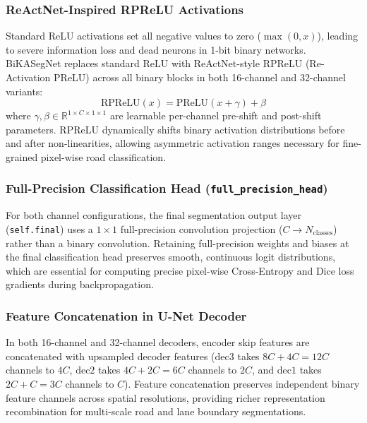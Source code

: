 \documentclass[a4paper]{report}
\begin{document}
\subsubsection{ReActNet-Inspired RPReLU Activations}
Standard ReLU activations set all negative values to zero ($\max(0, x)$), leading to severe information loss and dead neurons in 1-bit binary networks. BiKASegNet replaces standard ReLU with ReActNet-style RPReLU (Re-Activation PReLU) across all binary blocks in both 16-channel and 32-channel variants:
\begin{equation}
    \text{RPReLU}(x) = \text{PReLU}(x + \gamma) + \beta
\end{equation}
where $\gamma, \beta \in \mathbb{R}^{1 \times C \times 1 \times 1}$ are learnable per-channel pre-shift and post-shift parameters. RPReLU dynamically shifts binary activation distributions before and after non-linearities, allowing asymmetric activation ranges necessary for fine-grained pixel-wise road classification.

\subsubsection{Full-Precision Classification Head (\texttt{full\_precision\_head})}
For both channel configurations, the final segmentation output layer (\texttt{self.final}) uses a $1\times1$ full-precision convolution projection ($C \rightarrow N_{\text{classes}}$) rather than a binary convolution. Retaining full-precision weights and biases at the final classification head preserves smooth, continuous logit distributions, which are essential for computing precise pixel-wise Cross-Entropy and Dice loss gradients during backpropagation.

\subsubsection{Feature Concatenation in U-Net Decoder}
In both 16-channel and 32-channel decoders, encoder skip features are concatenated with upsampled decoder features ($\text{dec3}$ takes $8C + 4C = 12C$ channels to $4C$, $\text{dec2}$ takes $4C + 2C = 6C$ channels to $2C$, and $\text{dec1}$ takes $2C + C = 3C$ channels to $C$). Feature concatenation preserves independent binary feature channels across spatial resolutions, providing richer representation recombination for multi-scale road and lane boundary segmentations.
\end{document}
